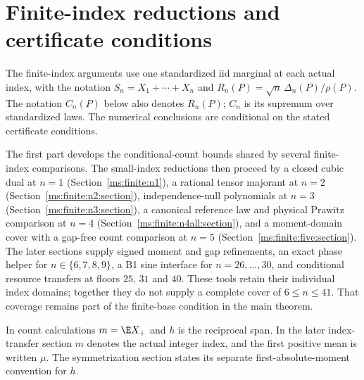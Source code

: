 \section{Finite-index reductions and certificate conditions}
\label{ms:finite:scope}
The finite-index arguments use one standardized iid marginal at each actual
index, with the notation $S_n=X_1+\cdots+X_n$ and
$R_n(P)=\sqrt n\,\Delta_n(P)/\rho(P)$. The notation $C_n(P)$ below
also denotes $R_n(P)$; $C_n$ is its supremum over standardized laws.
The numerical conclusions are conditional on the stated certificate conditions.

The first part develops the conditional-count bounds shared by several
finite-index comparisons. The small-index reductions then proceed by a
closed cubic dual at $n=1$ (Section~\ref{ms:finite:n1}), a rational tensor
majorant at $n=2$ (Section~\ref{ms:finite:n2:section}), independence-null
polynomials at $n=3$ (Section~\ref{ms:finite:n3:section}), a canonical
reference law and physical Prawitz comparison at $n=4$
(Section~\ref{ms:finite:n4all:section}), and a moment-domain cover with a
gap-free count comparison at $n=5$ (Section~\ref{ms:finite:five:section}).
The later sections supply signed moment and gap refinements, an exact phase
helper for $n\in\{6,7,8,9\}$, a B1 sine interface for $n=26,\ldots,30$,
and conditional resource transfers at floors $25$, $31$ and $40$.
These tools retain their individual index domains; together they do not
supply a complete cover of $6\le n\le41$. That coverage remains part of
the finite-base condition in the main theorem.

In count calculations $m=\E X_+$ and $h$ is the reciprocal span.
In the later index-transfer section $m$ denotes the actual integer index,
and the first positive mean is written $\mu$. The symmetrization section
states its separate first-absolute-moment convention for $h$.

